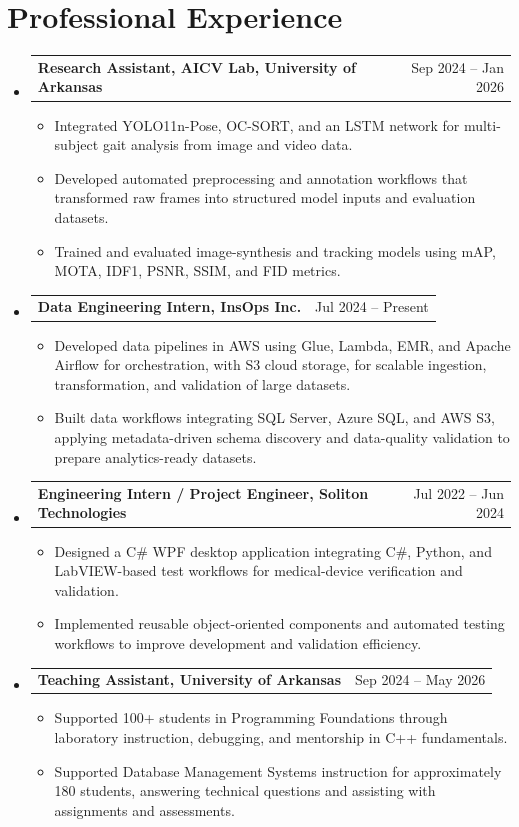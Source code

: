\documentclass[letterpaper,10pt]{article}
\makeatletter
\newcommand{\resumeSingleHeading}[2]{\vspace{1pt}\item\begin{tabular*}{0.985\textwidth}{l@{\extracolsep{\fill}}r}\textbf{#1} & \small#2 \\ \end{tabular*}\vspace{2pt}}
\newcommand{\resumeItem}[1]{\item\small{#1}}
\newcommand{\resumeSubHeadingListStart}{\begin{itemize}[leftmargin=0.0in,label={}]}
\newcommand{\resumeSubHeadingListEnd}{\end{itemize}\vspace{-2pt}}
\newcommand{\resumeItemListStart}{\begin{itemize}[leftmargin=0.17in]}
\newcommand{\resumeItemListEnd}{\end{itemize}\vspace{2pt}}
\makeatother
\begin{document}
\section{Professional Experience}
\resumeSubHeadingListStart
  \resumeSingleHeading{Research Assistant, AICV Lab, University of Arkansas}{Sep 2024 -- Jan 2026}
  \resumeItemListStart
    \resumeItem{Integrated YOLO11n-Pose, OC-SORT, and an LSTM network for multi-subject gait analysis from image and video data.}
    \resumeItem{Developed automated preprocessing and annotation workflows that transformed raw frames into structured model inputs and evaluation datasets.}
    \resumeItem{Trained and evaluated image-synthesis and tracking models using mAP, MOTA, IDF1, PSNR, SSIM, and FID metrics.}
  \resumeItemListEnd
  \resumeSingleHeading{Data Engineering Intern, InsOps Inc.}{Jul 2024 -- Present}
  \resumeItemListStart
    \resumeItem{Developed data pipelines in AWS using Glue, Lambda, EMR, and Apache Airflow for orchestration, with S3 cloud storage, for scalable ingestion, transformation, and validation of large datasets.}
    \resumeItem{Built data workflows integrating SQL Server, Azure SQL, and AWS S3, applying metadata-driven schema discovery and data-quality validation to prepare analytics-ready datasets.}
  \resumeItemListEnd
  \resumeSingleHeading{Engineering Intern / Project Engineer, Soliton Technologies}{Jul 2022 -- Jun 2024}
  \resumeItemListStart
    \resumeItem{Designed a C\# WPF desktop application integrating C\#, Python, and LabVIEW-based test workflows for medical-device verification and validation.}
    \resumeItem{Implemented reusable object-oriented components and automated testing workflows to improve development and validation efficiency.}
  \resumeItemListEnd
  \resumeSingleHeading{Teaching Assistant, University of Arkansas}{Sep 2024 -- May 2026}
  \resumeItemListStart
    \resumeItem{Supported 100+ students in Programming Foundations through laboratory instruction, debugging, and mentorship in C++ fundamentals.}
    \resumeItem{Supported Database Management Systems instruction for approximately 180 students, answering technical questions and assisting with assignments and assessments.}
  \resumeItemListEnd
\resumeSubHeadingListEnd
\end{document}
